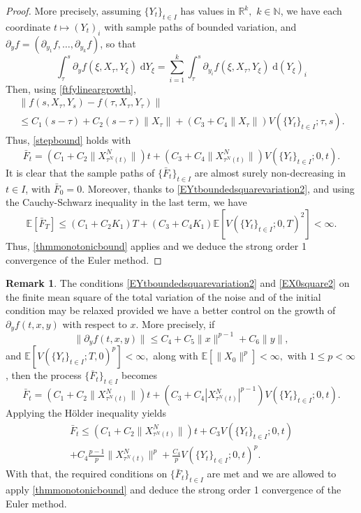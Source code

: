 \documentclass[reqno,12pt]{amsart}
\theoremstyle{plain} %
\theoremstyle{definition} %
\newtheorem{remark}{Remark}[section]
\begin{document}
\begin{proof}
    More precisely, assuming $\{Y_t\}_{t\in I}$ has values in $\mathbb{R}^k,$ $k\in \mathbb{N}$, we have each coordinate $t \mapsto (Y_t)_i$ with sample paths of bounded variation, and $\partial_y f = (\partial_{y_1}f, \ldots, \partial_{y_k}f)$, so that
    \[
        \int_\tau^s \partial_y f(\xi, X_\tau, Y_\xi) \;\mathrm{d} Y_\xi = \sum_{i=1}^k \int_\tau^s \partial_{y_i} f(\xi, X_\tau, Y_\xi) \;\mathrm{d} (Y_\xi)_i
    \]
    Then, using \eqref{ftfylineargrowth},
    \begin{multline*}
        \|f(s, X_\tau, Y_s) - f(\tau, X_\tau, Y_\tau)\| \\
        \leq C_1 (s-\tau) + C_2(s-\tau) \|X_\tau\| + (C_3 + C_4 \|X_\tau\|) V(\{Y_t\}_{t\in I}; \tau, s).
    \end{multline*}
    Thus, \eqref{stepbound} holds with
    \[
        \bar F_t = (C_1 + C_2 \|X_{\tau^N(t)}^N\|)t + (C_3 + C_4 \|X_{\tau^N(t)}^N\|) V(\{Y_t\}_{t\in I}; 0, t).
    \]
    It is clear that the sample paths of $\{\bar F_t\}_{t\in I}$ are almost surely non-decreasing in $t\in I$, with $\bar F_0 = 0$. Moreover, thanks to \eqref{EYtboundedsquarevariation2}, and using the Cauchy-Schwarz inequality in the last term, we have
    \[
        \mathbb{E}[\bar F_T] \leq (C_1 + C_2 K_1)T + (C_3 + C_4K_1)\mathbb{E}[V(\{Y_t\}_{t\in I}; 0, T)^2] < \infty.
    \]
    Thus, \cref{thmmonotonicbound} applies and we deduce the strong order 1 convergence of the Euler method.
\end{proof}

\begin{remark}
    The conditions \eqref{EYtboundedsquarevariation2} and \eqref{EX0square2} on the finite mean square of the total variation of the noise and of the initial condition may be relaxed provided we have a better control on the growth of $\partial_y f(t, x, y)$ with respect to $x$. More precisely, if
    \[
        \|\partial_y f(t, x, y)\| \leq C_4 + C_5\|x\|^{p-1} + C_6\|y\|,
    \]
    and $\mathbb{E}[V(\{Y_t\}_{t\in I}; T, 0)^p] < \infty,$ along with $\mathbb{E}[\|X_0\|^p] < \infty,$ with $1 \leq p < \infty$, then the process $\{\bar F_t\}_{t\in I}$ becomes
    \[
        \bar F_t = (C_1 + C_2 \|X_{\tau^N(t)}^N\|)t + (C_3 + C_4 |X_{\tau^N(t)}^N|^{p-1}) V(\{Y_t\}_{t\in I}; 0, t).
    \]
    Applying the H\"older inequality yields
    \begin{multline*}
        \bar F_t \leq (C_1 + C_2 \|X_{\tau^N(t)}^N\|)t + C_3 V(\{Y_t\}_{t\in I}; 0, t) \\
        + C_4 \frac{p-1}{p}\|X_{\tau^N(t)}^N\|^p  + \frac{C_4}{p} V(\{Y_t\}_{t\in I}; 0, t)^p.
    \end{multline*}
    With that, the required conditions on $\{\bar F_t\}_{t\in I}$ are met and we are allowed to apply \cref{thmmonotonicbound} and deduce the strong order 1 convergence of the Euler method.
\end{remark}
\end{document}
